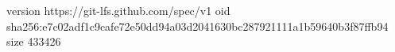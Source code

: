 version https://git-lfs.github.com/spec/v1
oid sha256:e7c02adf1c9cafe72e50dd94a03d2041630bc287921111a1b59640b3f87ffb94
size 433426
